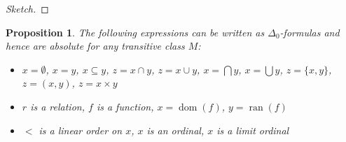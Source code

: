 \documentclass{article}
\newcommand{\Op}[1]{\operatorname{#1}}
\newtheorem{proposition}{Proposition}[section]
\begin{document}
\begin{proof}[Sketch]
\end{proof}\begin{proposition}The following expressions can be written as $\Delta_0$-formulas and hence are absolute for any transitive class $M$:

\begin{itemize}
\item $x = \emptyset$, $x=y$, $x \subseteq y$, $z = x \cap y$, $z = x \cup y$, $x = \bigcap y$, $x = \bigcup y$, $z = \{x,y\}$, $z =(x,y)$, $z= x \times y$
\item $r$ is a relation, $f$ is a function, $x = \Op{dom}(f)$, $y = \Op{ran}(f)$
\item $<$ is a linear order on $x$, $x$ is an ordinal, $x$ is a limit ordinal
\end{itemize}

\end{proposition}
\end{document}

